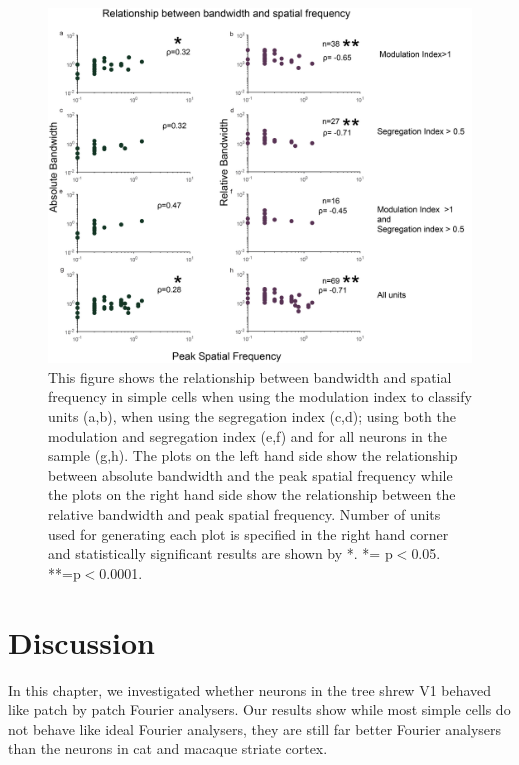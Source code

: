 		\begin{figure}[H]
		
		\includegraphics[width=\linewidth]{LinearV1/hwpksf.jpg}
		\caption{This figure shows the relationship between bandwidth and spatial frequency in simple cells when using the modulation index to classify units (a,b), when using the segregation index (c,d); using both the modulation and segregation index (e,f) and for all neurons in the sample (g,h). The plots on the left hand side show the relationship between absolute bandwidth and the peak spatial frequency while the plots on the right hand side show the relationship between the relative bandwidth and peak spatial frequency. Number of units used for generating each plot is specified in the right hand corner and statistically significant results are shown by *. *= p$<$0.05. **=p$<$0.0001.}
		\label{fig:fig6}
	\end{figure}
	
	
	\section{Discussion}
	
	In this chapter, we investigated whether neurons in the tree shrew V1 behaved like patch by patch Fourier analysers. Our results show while most simple cells do not behave like ideal Fourier analysers, they are still far better Fourier analysers than the neurons in cat and macaque striate cortex.
	
